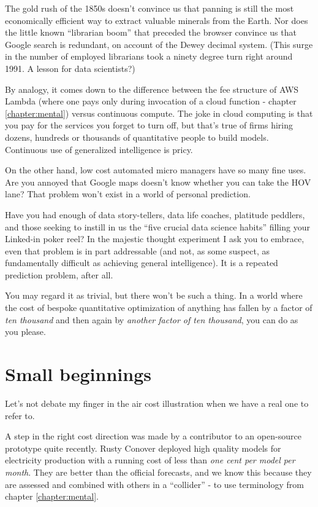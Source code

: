 The gold rush of the 1850s doesn't convince us that panning is still the most economically efficient way to extract valuable minerals from the Earth. Nor does the little known ``librarian boom'' that preceded the browser convince us that Google search is redundant, on account of the Dewey decimal system. (This surge in the number of employed librarians took a ninety degree turn right around 1991. A lesson for data scientists?) 



By analogy, it comes down to the difference between the fee structure of AWS Lambda (where one pays only during invocation of a cloud function - chapter \ref{chapter:mental}) versus continuous compute. The joke in cloud computing is that you pay for the services you forget to turn off, but that's true of firms hiring dozens, hundreds or thousands of quantitative people to build models. Continuous use of generalized intelligence is pricy. 


On the other hand, low cost automated micro managers have so many fine uses. Are you annoyed that Google maps doesn't know whether you can take the HOV lane? That problem won't exist in a world of personal prediction. 


Have you had enough of data story-tellers, data life coaches, platitude peddlers, and those seeking to instill in us the ``five crucial data science habits'' filling your Linked-in poker reel? In the majestic thought experiment I ask you to embrace, even that problem is in part addressable (and not, as some suspect, as fundamentally difficult as achieving general intelligence). It is a repeated prediction problem, after all. 


You may regard it as trivial, but there won't be such a thing. In a world where the cost of bespoke quantitative optimization of anything has fallen by a factor of {\em ten thousand} and then again by {\em another factor of ten thousand}, you can do as you please.  
 

\section{Small beginnings}


Let's not debate my finger in the air cost illustration when we have a real one to refer to. 


A step in the right cost direction was made by a contributor to an open-source prototype quite recently. Rusty Conover deployed high quality models for electricity production with a running cost of less than {\em one cent per model per month}. They are better than the official forecasts, and we know this because they are assessed and combined with others in a ``collider'' - to use terminology from chapter \ref{chapter:mental}. 

